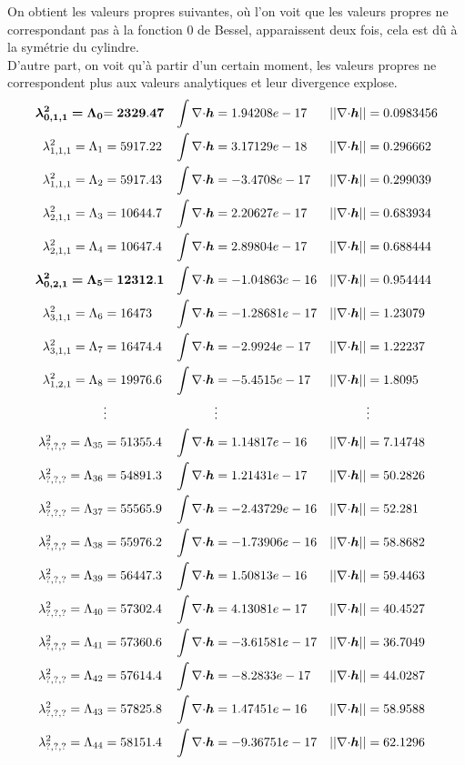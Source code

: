 On obtient les valeurs propres suivantes, où l'on voit que les valeurs propres ne correspondant pas à la fonction 0 de Bessel, apparaissent deux fois, cela est dû à la symétrie du cylindre.\\
D'autre part, on voit qu'à partir d'un certain moment, les valeurs propres ne correspondent plus aux valeurs analytiques et leur divergence explose.\\
\begin{align*}
\bm{\lambda^2_{0,1,1}=\Lambda_0} &\bf{= 2329.47}	&\int{\nabla\cdot}\bm{h} &= 1.94208e-17	&||{\nabla\cdot}\bm{h}|| &= 0.0983456\\
\lambda^2_{1,1,1}=\Lambda_1 &= 5917.22	&\int{\nabla\cdot}\bm{h} &= 3.17129e-18	&||{\nabla\cdot}\bm{h}|| &= 0.296662\\
\lambda^2_{1,1,1}=\Lambda_2 &= 5917.43	&\int{\nabla\cdot}\bm{h} &= -3.4708e-17	&||{\nabla\cdot}\bm{h}|| &= 0.299039\\
\lambda^2_{2,1,1}=\Lambda_3 &= 10644.7	&\int{\nabla\cdot}\bm{h} &= 2.20627e-17	&||{\nabla\cdot}\bm{h}|| &= 0.683934\\
\lambda^2_{2,1,1}=\Lambda_4 &= 10647.4	&\int{\nabla\cdot}\bm{h} &= 2.89804e-17	&||{\nabla\cdot}\bm{h}|| &= 0.688444\\
\bm{\lambda^2_{0,2,1}=\Lambda_5} &\bf{= 12312.1}	&\int{\nabla\cdot}\bm{h} &= -1.04863e-16	&||{\nabla\cdot}\bm{h}|| &= 0.954444\\
\lambda^2_{3,1,1}=\Lambda_6 &= 16473	&\int{\nabla\cdot}\bm{h} &= -1.28681e-17	&||{\nabla\cdot}\bm{h}|| &= 1.23079\\
\lambda^2_{3,1,1}=\Lambda_7 &= 16474.4	&\int{\nabla\cdot}\bm{h} &= -2.9924e-17	&||{\nabla\cdot}\bm{h}|| &= 1.22237\\
\lambda^2_{1,2,1}=\Lambda_8 &= 19976.6	&\int{\nabla\cdot}\bm{h} &= -5.4515e-17	&||{\nabla\cdot}\bm{h}|| &= 1.8095\\
&\vdots & &\vdots & &\vdots\\
\lambda^2_{?,?,?}=\Lambda_{35} &= 51355.4	&\int{\nabla\cdot}\bm{h} &= 1.14817e-16	&||{\nabla\cdot}\bm{h}|| &= 7.14748\\
\lambda^2_{?,?,?}=\Lambda_{36} &= 54891.3	&\int{\nabla\cdot}\bm{h} &= 1.21431e-17	&||{\nabla\cdot}\bm{h}|| &= 50.2826\\
\lambda^2_{?,?,?}=\Lambda_{37} &= 55565.9	&\int{\nabla\cdot}\bm{h} &= -2.43729e-16	&||{\nabla\cdot}\bm{h}|| &= 52.281\\
\lambda^2_{?,?,?}=\Lambda_{38} &= 55976.2	&\int{\nabla\cdot}\bm{h} &= -1.73906e-16	&||{\nabla\cdot}\bm{h}|| &= 58.8682\\
\lambda^2_{?,?,?}=\Lambda_{39} &= 56447.3	&\int{\nabla\cdot}\bm{h} &= 1.50813e-16	&||{\nabla\cdot}\bm{h}|| &= 59.4463\\
\lambda^2_{?,?,?}=\Lambda_{40} &= 57302.4	&\int{\nabla\cdot}\bm{h} &= 4.13081e-17	&||{\nabla\cdot}\bm{h}|| &= 40.4527\\
\lambda^2_{?,?,?}=\Lambda_{41} &= 57360.6	&\int{\nabla\cdot}\bm{h} &= -3.61581e-17	&||{\nabla\cdot}\bm{h}|| &= 36.7049\\
\lambda^2_{?,?,?}=\Lambda_{42} &= 57614.4	&\int{\nabla\cdot}\bm{h} &= -8.2833e-17	&||{\nabla\cdot}\bm{h}|| &= 44.0287\\
\lambda^2_{?,?,?}=\Lambda_{43} &= 57825.8	&\int{\nabla\cdot}\bm{h} &= 1.47451e-16	&||{\nabla\cdot}\bm{h}|| &= 58.9588\\
\lambda^2_{?,?,?}=\Lambda_{44} &= 58151.4	&\int{\nabla\cdot}\bm{h} &= -9.36751e-17	&||{\nabla\cdot}\bm{h}|| &= 62.1296
\end{align*}

